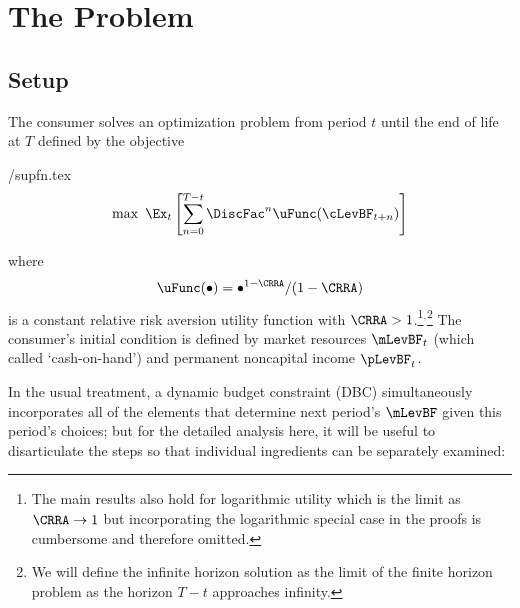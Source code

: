 \documentclass[./BufferStockTheory.tex]{subfiles}
\begin{document}
\hypertarget{The-Problem}{}
\section{The Problem}

\subsection{Setup}
\label{subsec:Setup}

The consumer solves an optimization problem from period
$t$ until the end of life at $T$ defined by the objective
\begin{verbatimwrite}{\EqDir/supfn.tex}
\begin{align}
  \label{eq:supfn}
  \max~ \Ex_{t}\left[\sum_{n=0}^{T-t} \DiscFac^{n} \uFunc(\cLevBF_{t+n})\right]
\end{align}
\end{verbatimwrite}

where
\begin{align}
  \uFunc(\bullet)=\bullet^{1-\CRRA}/(1-\CRRA) \label{eq:crrautil}
\end{align}
 is a constant relative risk aversion utility function with $\CRRA > 1$.\footnote{The main
  results also hold for logarithmic utility which is the limit as
  $\CRRA \rightarrow 1$ but incorporating the logarithmic special case
  in the proofs is cumbersome and therefore
  omitted.}$^{,}$\footnote{We will define the infinite horizon
  solution as the limit of the finite horizon problem as the horizon
  $T-t$ approaches infinity.}  The consumer's initial condition is
defined by market resources $\mLevBF_{t}$ (which \cite{deatonLiqConstr}
called `cash-on-hand') and permanent noncapital income $\pLevBF_{t}$.

In the usual treatment, a dynamic budget constraint (DBC) simultaneously incorporates
all of the elements that determine next period's $\mLevBF$ given this
period's choices; but for the detailed analysis here, it will be useful to
disarticulate the steps so that individual ingredients can be separately examined:
\end{document}
